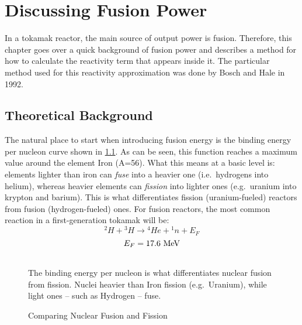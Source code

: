 \chapter{Discussing Fusion Power}

\label{chapter:power}

In a tokamak reactor, the main source of output power is fusion. Therefore, this chapter goes over a quick background of fusion power and describes a method for how to calculate the reactivity term that appears inside it. The particular method used for this reactivity approximation was done by Bosch and Hale in 1992.\cite{boschhale}

\section{Theoretical Background}

The natural place to start when introducing fusion energy is the binding energy per nucleon curve shown in \cref{fig:binding_energy}. As can be seen, this function reaches a maximum value around the element Iron (A=56). What this means at a basic level is: elements lighter than iron can \emph{fuse} into a heavier one (i.e.\ hydrogens into helium), whereas heavier elements can \emph{fission} into lighter ones (e.g.\ uranium into krypton and barium). This is what differentiates fission (uranium-fueled) reactors from fusion (hydrogen-fueled) ones. For fusion reactors, the most common reaction in a first-generation tokamak will be:
\begin{equation}
	{}^2H+ {}^3H \rightarrow {}^4 He + {}^1 n + E_F
\end{equation}
\begin{equation}
	E_F = 17.6 \ \textnormal{MeV}
\end{equation}










\begin{figure}
	\centering
	\begin{adjustbox}{width=0.75\textwidth}
		
	\end{adjustbox}
	\caption{Comparing Nuclear Fusion and Fission} ~\\
	\small The binding energy per nucleon is what differentiates nuclear fusion from fission. Nuclei heavier than Iron fission (e.g.\ Uranium), while light ones -- such as Hydrogen -- fuse. 
	\label{fig:binding_energy}
\end{figure}

